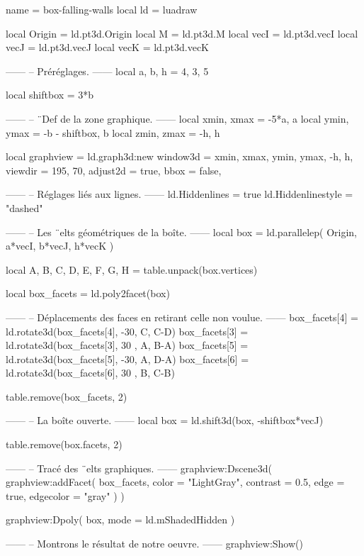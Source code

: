 \documentclass[border = 3pt]{standalone}
\begin{document}
\begin{luadraw*}{name = box-falling-walls}
local ld = luadraw

local Origin = ld.pt3d.Origin
local M      = ld.pt3d.M
local vecI   = ld.pt3d.vecI
local vecJ   = ld.pt3d.vecJ
local vecK   = ld.pt3d.vecK

------
-- Préréglages.
------
local a, b, h = 4, 3, 5

local shiftbox = 3*b

------
-- ¨Def de la zone graphique.
------
local xmin, xmax = -5*a, a
local ymin, ymax = -b - shiftbox, b
local zmin, zmax = -h, h

local graphview = ld.graph3d:new{
  window3d = {xmin, xmax, ymin, ymax, -h, h},
  viewdir  = {195, 70},
  adjust2d = true,
  bbox     = false,
}

------
-- Réglages liés aux lignes.
------
ld.Hiddenlines     = true
ld.Hiddenlinestyle = "dashed"

------
-- Les ¨elts géométriques de la boîte.
------
local box = ld.parallelep(
  Origin,
  a*vecI, b*vecJ, h*vecK
)

local A, B, C, D, E, F, G, H = table.unpack(box.vertices)

local box_facets = ld.poly2facet(box)

------
-- Déplacements des faces en retirant celle non voulue.
------
box_facets[4] = ld.rotate3d(box_facets[4], -30, {C, C-D})
box_facets[3] = ld.rotate3d(box_facets[3], 30 , {A, B-A})
box_facets[5] = ld.rotate3d(box_facets[5], -30, {A, D-A})
box_facets[6] = ld.rotate3d(box_facets[6], 30 , {B, C-B})

table.remove(box_facets, 2)

------
-- La boîte ouverte.
------
local box = ld.shift3d(box, -shiftbox*vecJ)

table.remove(box.facets, 2)

------
-- Tracé des ¨elts graphiques.
------
graphview:Dscene3d(
  graphview:addFacet(
    box_facets,
    {
      color     = "LightGray",
      contrast  = 0.5,
      edge      = true,
      edgecolor = "gray"
    }
  )
)

graphview:Dpoly(
  box,
  {mode = ld.mShadedHidden}
)

------
-- Montrons le résultat de notre oeuvre.
------
graphview:Show()
\end{luadraw*}
\end{document}
